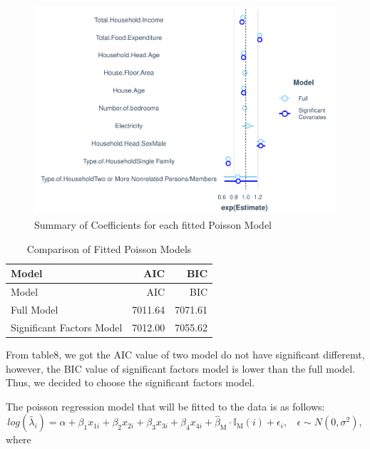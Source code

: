 \documentclass[
]{article}
\begin{document}
\begin{figure}[H]

{\centering \includegraphics[width=0.8\linewidth]{Group_01_Project2_demo_files/figure-latex/summary plot-1} 

}

\caption{Summary of Coefficients for each fitted Poisson Model}\label{fig:summary plot}
\end{figure}

\begin{longtable}[]{@{}lrr@{}}
\caption{Comparison of Fitted Poisson Models}\tabularnewline
\toprule
Model & AIC & BIC \\
\midrule
\endfirsthead
\toprule
Model & AIC & BIC \\
\midrule
\endhead
Full Model & 7011.64 & 7071.61 \\
Significant Factors Model & 7012.00 & 7055.62 \\
\bottomrule
\end{longtable}

From table8, we got the AIC value of two model do not have significant
differemt, however, the BIC value of significant factors model is lower
than the full model. Thus, we decided to choose the significant factors
model.

The poisson regression model that will be fitted to the data is as
follows:
\[log(\tilde{\lambda_i}) = \alpha + \beta_1 x_{1i} + \beta_2 x_{2i} + \beta_3 x_{3i} + \beta_4 x_{4i} + \widehat{\beta}_{\mbox{M}} \cdot \mathbb{I}_{\mbox{M}}(i) + \epsilon_i, ~~~~ \epsilon \sim N(0, \sigma^2),\]
where
\end{document}
